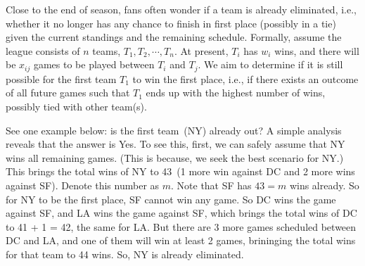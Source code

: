 
Close to the end of season, fans often wonder if a team is already eliminated, i.e., 
whether it no longer has any chance to finish in first place (possibly in a tie) given the current standings and the remaining schedule.
Formally, assume the league consists of $n$ teams, $T_1, T_2, \cdots, T_n$.
At present, $T_i$ has $w_i$ wins, and there will be $x_{ij}$ games
to be played between $T_i$ and $T_j$. We aim to determine if it is still possible for the first team $T_1$ to
win the first place, i.e., if there exists an outcome of all future games such
that $T_1$ ends up with the highest number of wins, possibly tied with other team(s).

See one example below: is the first team~(NY) already out?
A simple analysis reveals that the answer is Yes.
To see this, first, we can safely assume that NY wins
all remaining games. (This is because, we seek the best scenario for NY.)
This brings the total wins of NY to 43~(1 more win against DC and 2 more wins against SF). 
Denote this number as $m$.
Note that SF has $43=m$ wins already. So for NY to be the first place,
SF cannot win any game. So DC wins the game against SF, and LA wins the game against SF,
which brings the total wins of DC to 41 + 1 = 42, the same for LA.
But there are 3 more games scheduled between DC and LA, and one of them
will win at least 2 games, brininging the total wins for that team to 44 wins.
So, NY is already eliminated.

